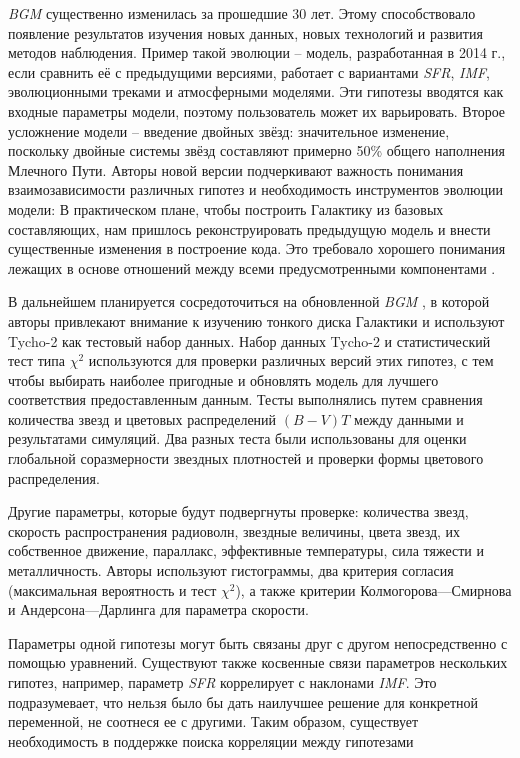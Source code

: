 \textit{BGM} существенно изменилась за прошедшие 30 лет. Этому способствовало появление результатов изучения новых 
данных, новых технологий и развития методов наблюдения. Пример такой эволюции – модель, разработанная в 2014 г., 
если сравнить её с предыдущими версиями, работает с вариантами \textit{SFR}, \textit{IMF}, эволюционными треками 
и атмосферными моделями. Эти гипотезы вводятся как входные параметры модели, поэтому пользователь может их 
варьировать. Второе усложнение модели – введение двойных звёзд: значительное изменение, поскольку двойные системы 
звёзд составляют примерно 50\% общего наполнения Млечного Пути. Авторы новой версии подчеркивают важность 
понимания взаимозависимости различных гипотез и необходимость инструментов эволюции модели: В практическом плане, 
чтобы построить Галактику из базовых составляющих, нам пришлось реконструировать предыдущую модель и внести 
существенные изменения в построение кода. Это требовало хорошего понимания лежащих в основе отношений между 
всеми предусмотренными компонентами \cite{czekaj2012galaxy}. 
    
В дальнейшем планируется сосредоточиться на обновленной \textit{BGM} \cite{czekaj2014besanccon}, в которой авторы 
привлекают внимание к изучению тонкого диска Галактики и используют Tycho-2 как тестовый набор данных. Набор данных 
Tycho-2 и статистический тест типа $\chi^2$ используются для проверки различных версий этих гипотез, с тем чтобы 
выбирать наиболее пригодные и обновлять модель для лучшего соответствия предоставленным данным. 
Тесты выполнялись путем сравнения количества звезд и цветовых распределений $(B-V)T$ между данными и результатами 
симуляций. Два разных теста были использованы для оценки глобальной соразмерности звездных плотностей и проверки 
формы цветового распределения. 

Другие параметры, которые будут подвергнуты проверке: количества звезд, скорость распространения радиоволн, звездные 
величины, цвета звезд, их собственное движение, параллакс, эффективные температуры, сила тяжести и металличность. 
Авторы используют гистограммы, два критерия согласия (максимальная вероятность и тест $\chi^2$), а также критерии 
Колмогорова---Смирнова и Андерсона---Дарлинга для параметра скорости. 

Параметры одной гипотезы могут быть связаны друг с другом непосредственно с помощью уравнений. Существуют также 
косвенные связи параметров нескольких гипотез, например, параметр \textit{SFR} коррелирует с наклонами \textit{IMF}. 
Это подразумевает, что нельзя было бы дать наилучшее решение для конкретной переменной, не соотнеся ее с другими. 
Таким образом, существует необходимость в поддержке поиска корреляции между гипотезами

